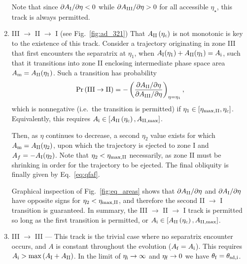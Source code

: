 \documentclass[
        fleqn,
        usenatbib,
    ]{mnras}
\newcommand*{\pdil}[2]{\partial#1 / \partial#2}
\newcommand*{\p}[1]{\left(#1\right)}
\newcommand*{\s}[1]{\left[#1\right]}
\begin{document}
\begin{enumerate}
        Note that since $\pdil{A_{\rm I}}{\eta} < 0$ while $\pdil{A_{\rm
        III}}{\eta} > 0$ for all accessible $\eta_{\star}$, this track is
        always permitted.

    \item III $\to$ II $\to$ I (see Fig.~\ref{fig:ad_321}) That $A_{\rm II}
        \p{\eta_c}$ is not monotonic is key to the existence of this track.
        Consider a trajectory originating in zone III that first encounters the
        separatrix at $\eta_1$, when $A_{\rm I}(\eta_1) + A_{\rm II}(\eta_1) =
        A_{\rm i}$, such that it transitions into zone II enclosing
        intermediate phase space area $A_{\rm m} = A_{\rm II}(\eta_1)$. Such a
        transition has probability
        \begin{equation}
            \Pr\p{\rm III \to II} = -\p{
                \frac{\pdil{A_{\rm II}}{\eta}}{\pdil{A_{\rm III}}{\eta}}}
                    _{\eta = \eta_1},
        \end{equation}
        which is nonnegative (i.e.\ the transition is permitted) if $\eta_1
        \in [\eta_{\rm \max, II}, \eta_c]$. Equivalently, this requires
        $A_{\rm i} \in \s{A_{\rm II}\p{\eta_{\rm c}} , A_{\rm II, \max}}$.

        Then, as $\eta$ continues to decrease, a second $\eta_2$ value exists
        for which $A_{\rm m} = A_{\rm II}(\eta_2)$, upon which the trajectory
        is ejected to zone I and $A_f = -A_{\rm I}(\eta_2)$. Note that $\eta_2
        < \eta_{\rm \max, II}$ necessarily, as zone II must be shrinking in
        order for the trajectory to be ejected. The final obliquity is finally
        given by Eq.~\eqref{eq:qfaf}.

        Graphical inspection of Fig.~\ref{fig:eq_areas} shows that
        $\pdil{A_{\rm II}}{\eta}$ and $\pdil{A_{\rm I}}{\eta}$ have opposite
        signs for $\eta_2 < \eta_{\rm \max, II}$, and therefore the second II
        $\to$ I transition is guaranteed. In summary, the III $\to$ II $\to$ I
        track is permitted so long as the first transition is permitted, or
        $A_{\rm i} \in \s{A_{\rm II}\p{\eta_{\rm c}} , A_{\rm II, \max}}$.

    \item III $\to$ III --- This track is the trivial case where no separatrix
        encounter occurs, and $A$ is constant throughout the evolution ($A_{\rm
        f} = A_{\rm i}$). This requires $A_{\rm i} > \max \p{A_{\rm I} + A_{\rm
        II}}$. In the limit of $\eta_{\rm i} \to \infty$ and $ \eta_{\rm f} \to
        0$ we have $\theta_{\rm f} = \theta_{\rm sd, i}$.


\end{enumerate}
\end{document}
